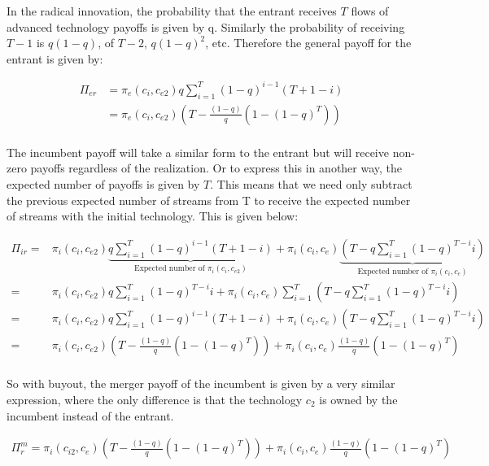 \documentclass[11pt]{article}
\begin{document}
In the radical innovation, the probability that the entrant receives $T$ flows of advanced technology payoffs is given by q. Similarly the probability of receiving $T-1$ is $q(1-q)$, of $T-2$, $q(1-q)^2$, etc. Therefore the general payoff for the entrant is given by:

\begin{align*}
\Pi_{er} & = 
\pi_{e}(c_i,c_{e2}) q \sum_{i=1}^{T} (1-q)^{i-1} (T+1-i) \\
&= \pi_{e}(c_i,c_{e2}) \left( T - \frac{(1-q)}{q} \left( 1-(1-q)^T \right) \right) \\
\end{align*}

The incumbent payoff will take a similar form to the entrant but will receive non-zero payoffs regardless of the realization. Or to express this in another way, the expected number of payoffs is given by $T$. This means that we need only subtract the previous expected number of streams from T to receive the expected number of streams with the initial technology. This is given below: 

\begin{align*}
\Pi_{ir} =& \pi_{i}(c_i,c_{e2}) \underbrace{q \sum_{i=1}^{T} (1-q)^{i-1} (T+1-i)}_{\text{Expected number of } \pi_{i}(c_i,c_{e2})}+ \pi_i(c_i,c_e) \underbrace{ (T-q \sum_{i=1}^{T} (1-q)^{T-i} i)}_{\text{Expected number of } \pi_{i}(c_i,c_{e})}
\\
=& \pi_{i}(c_i,c_{e2}) q \sum_{i=1}^{T} (1-q)^{T-i} i + \pi_i(c_i,c_e)  \sum_{i=1}^T (T-q \sum_{i=1}^{T} (1-q)^{T-i} i)
\\ =& \pi_{i}(c_i,c_{e2})q \sum_{i=1}^{T} (1-q)^{i-1} (T+1-i)+ \pi_i(c_i,c_e) (T-q \sum_{i=1}^{T} (1-q)^{T-i} i)
\\ =&\pi_{i}(c_i,c_{e2}) \left( T - \frac{(1-q)}{q} \left( 1-(1-q)^T \right) \right)
+\pi_i(c_i,c_e) \frac{(1-q)}{q} \left( 1-(1-q)^T \right) \\
\end{align*}

So with buyout, the merger payoff of the incumbent is given by a very similar expression, where the only difference is that the technology $c_2$ is owned by the incumbent instead of the entrant. 

\begin{align*}
\Pi^m_r = \pi_{i}(c_{i2},c_{e}) \left( T - \frac{(1-q)}{q} \left( 1-(1-q)^T \right) \right)
+\pi_i(c_i,c_e) \frac{(1-q)}{q} \left( 1-(1-q)^T \right)
\end{align*}
\end{document}
